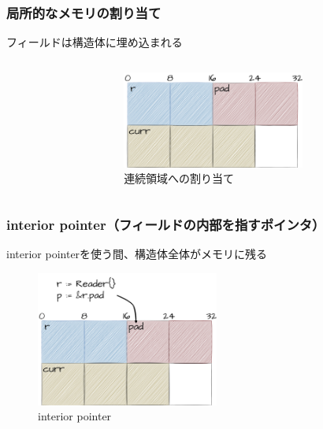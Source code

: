 \documentclass[unicode, 14pt, aspectratio=169]{beamer}
\begin{document}
\begin{frame}
  \frametitle{局所的なメモリの割り当て}
  {\large フィールドは構造体に埋め込まれる\supercite{ismmkeynote}}
  \begin{columns}
    \begin{column}{0.5\textwidth}
      
    \end{column}
    \begin{column}{0.5\textwidth}  %
      \begin{figure}[h]
        \includegraphics[width=6cm]{./img/address.png}
        \caption[memory]{連続領域への割り当て}
        \label{fig:struct}
      \end{figure}
    \end{column}
  \end{columns}  
\end{frame}
\begin{frame}
  \frametitle{interior pointer（フィールドの内部を指すポインタ）}
  {\large interior pointerを使う間、構造体全体がメモリに残る}
  \begin{figure}[h]
    \includegraphics[width=6cm]{./img/interior.png}
    \caption[memory]{interior pointer}
    \label{fig:interor}
  \end{figure}  
\end{frame}
\end{document}
